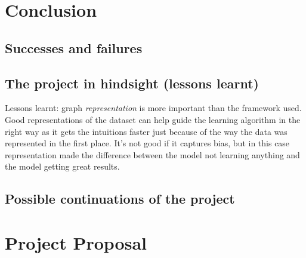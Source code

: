 \documentclass[12pt,a4paper,twoside, openright, hidelinks]{report}
\begin{document}
\chapter{Conclusion}


\section{Successes and failures}

\section{The project in hindsight (lessons learnt)}
Lessons learnt: graph \textit{representation} is more important than the framework used. Good representations of the dataset can help guide the learning algorithm in the right way as it gets the intuitions faster just because of the way the data was represented in the first place. It's not good if it captures bias, but in this case representation made the difference between the model not learning anything and the model getting great results.

\section{Possible continuations of the project}





\appendix

\chapter{Project Proposal}
% 
% 
\end{document}
